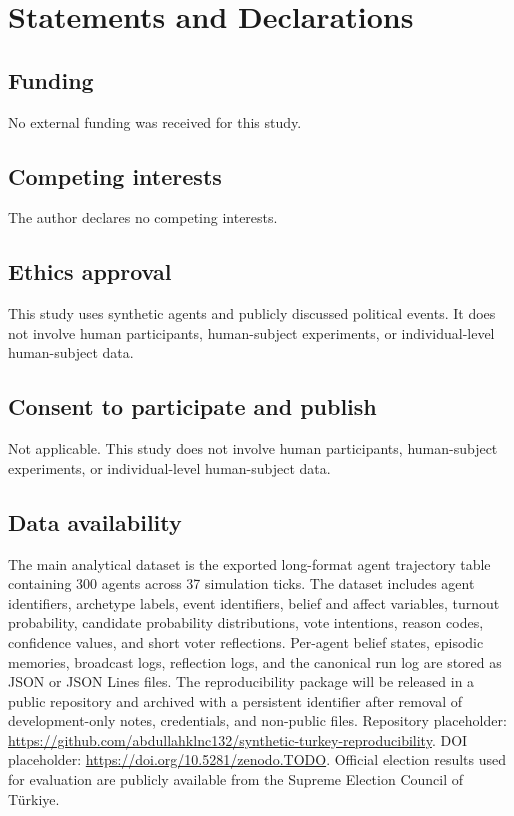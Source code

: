 \documentclass[pdflatex,sn-mathphys-num,iicol]{sn-jnl}
\begin{document}
\section*{Statements and Declarations}

\subsection*{Funding}

No external funding was received for this study.

\subsection*{Competing interests}

The author declares no competing interests.

\subsection*{Ethics approval}

This study uses synthetic agents and publicly discussed political events. It does not involve human participants, human-subject experiments, or individual-level human-subject data.

\subsection*{Consent to participate and publish}

Not applicable. This study does not involve human participants, human-subject experiments, or individual-level human-subject data.

\subsection*{Data availability}

The main analytical dataset is the exported long-format agent trajectory table containing 300 agents across 37 simulation ticks. The dataset includes agent identifiers, archetype labels, event identifiers, belief and affect variables, turnout probability, candidate probability distributions, vote intentions, reason codes, confidence values, and short voter reflections. Per-agent belief states, episodic memories, broadcast logs, reflection logs, and the canonical run log are stored as JSON or JSON Lines files. The reproducibility package will be released in a public repository and archived with a persistent identifier after removal of development-only notes, credentials, and non-public files. Repository placeholder: \url{https://github.com/abdullahklnc132/synthetic-turkey-reproducibility}. DOI placeholder: \url{https://doi.org/10.5281/zenodo.TODO}. Official election results used for evaluation are publicly available from the Supreme Election Council of Türkiye.
\end{document}
